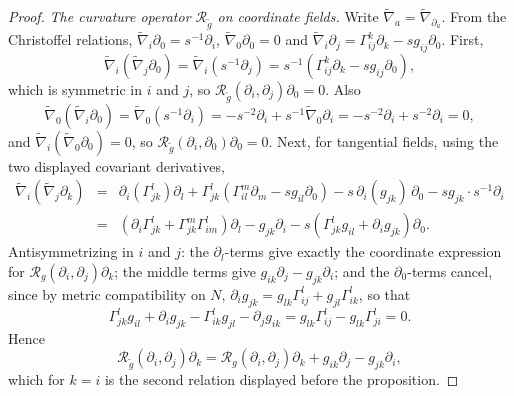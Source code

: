 \begin{proof}
\emph{The curvature operator ${\mathcal R}_{\tilde g}$ on coordinate
fields.} Write $\widetilde\nabla_a=\widetilde\nabla_{\partial_a}$.
From the Christoffel relations, $\widetilde\nabla_i\partial_0
=s^{-1}\partial_i$, $\widetilde\nabla_0\partial_0=0$ and
$\widetilde\nabla_i\partial_j
=\Gamma^k_{ij}\partial_k-sg_{ij}\partial_0$. First,
$$\widetilde\nabla_i\left(\widetilde\nabla_j\partial_0\right)
=\widetilde\nabla_i\left(s^{-1}\partial_j\right)
=s^{-1}\left(\Gamma^k_{ij}\partial_k-sg_{ij}\partial_0\right),$$
which is symmetric in $i$ and $j$, so ${\mathcal
R}_{\tilde g}(\partial_i,\partial_j)\partial_0=0$. Also
$$\widetilde\nabla_0\left(\widetilde\nabla_i\partial_0\right)
=\widetilde\nabla_0\left(s^{-1}\partial_i\right)
=-s^{-2}\partial_i+s^{-1}\widetilde\nabla_0\partial_i
=-s^{-2}\partial_i+s^{-2}\partial_i=0,$$
and $\widetilde\nabla_i(\widetilde\nabla_0\partial_0)=0$, so
${\mathcal R}_{\tilde g}(\partial_i,\partial_0)\partial_0=0$.
Next, for tangential fields, using the two displayed covariant
derivatives,
\begin{eqnarray*}
\widetilde\nabla_i\left(\widetilde\nabla_j\partial_k\right)
& = & \partial_i\left(\Gamma^l_{jk}\right)\partial_l
+\Gamma^l_{jk}\left(\Gamma^m_{il}\partial_m-sg_{il}\partial_0\right)
-s\,\partial_i(g_{jk})\,\partial_0-sg_{jk}\cdot s^{-1}\partial_i\\
& = & \left(\partial_i\Gamma^l_{jk}
+\Gamma^m_{jk}\Gamma^l_{im}\right)\partial_l
-g_{jk}\partial_i
-s\left(\Gamma^l_{jk}g_{il}+\partial_ig_{jk}\right)\partial_0.
\end{eqnarray*}
Antisymmetrizing in $i$ and $j$: the $\partial_l$-terms give exactly
the coordinate expression for ${\mathcal
R}_g(\partial_i,\partial_j)\partial_k$; the middle terms give
$g_{ik}\partial_j-g_{jk}\partial_i$; and the $\partial_0$-terms
cancel, since by metric compatibility on $N$,
$\partial_ig_{jk}=g_{lk}\Gamma^l_{ij}+g_{jl}\Gamma^l_{ik}$, so that
$$\Gamma^l_{jk}g_{il}+\partial_ig_{jk}
-\Gamma^l_{ik}g_{jl}-\partial_jg_{ik}
=g_{lk}\Gamma^l_{ij}-g_{lk}\Gamma^l_{ji}=0.$$
Hence
$$
{\mathcal R}_{\tilde g}(\partial_i,\partial_j)\partial_k
={\mathcal R}_g(\partial_i,\partial_j)\partial_k
+g_{ik}\partial_j-g_{jk}\partial_i,
$$
which for $k=i$ is the second relation displayed before the
proposition.


\end{proof}
